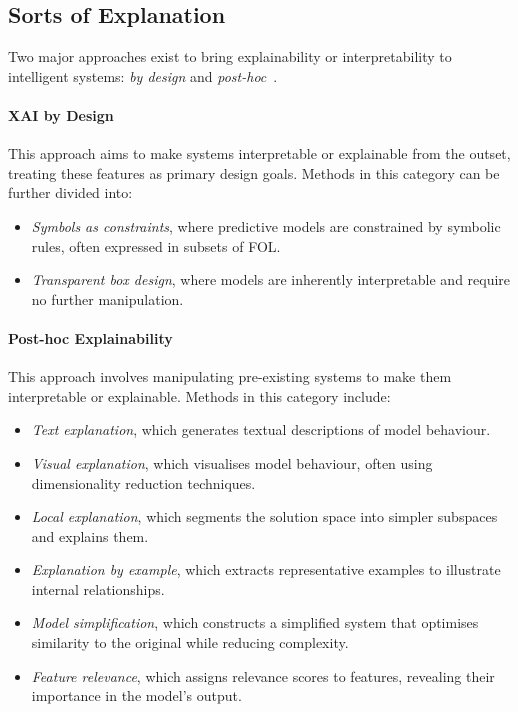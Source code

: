 \subsection{Sorts of Explanation}\label{subsec:sorts-of-explanation}
%
Two major approaches exist to bring explainability or interpretability to intelligent systems: \emph{by design} and \emph{post-hoc}~\cite{DBLP:conf/atal/CiattoSOC20,DBLP:journals/inffus/ArrietaRSBTBGGM20,DBLP:journals/csur/GuidottiMRTGP19}.


\paragraph{\Gls{XAI} by Design}
\label{par:xai-by-design}
%
This approach aims to make systems interpretable or explainable from the outset, treating these features as primary design goals.
%
Methods in this category can be further divided into:
%
\begin{itemize}
    \item \emph{Symbols as constraints}, where predictive models are constrained by symbolic rules, often expressed in subsets of \gls{FOL}.
    \item \emph{Transparent box design}, where models are inherently interpretable and require no further manipulation.
\end{itemize}

\paragraph{Post-hoc Explainability}
%
This approach involves manipulating pre-existing systems to make them interpretable or explainable.
%
Methods in this category include:
%
\begin{itemize}
    \item \emph{Text explanation}, which generates textual descriptions of model behaviour.
    \item \emph{Visual explanation}, which visualises model behaviour, often using dimensionality reduction techniques.
    \item \emph{Local explanation}, which segments the solution space into simpler subspaces and explains them.
    \item \emph{Explanation by example}, which extracts representative examples to illustrate internal relationships.
    \item \emph{Model simplification}, which constructs a simplified system that optimises similarity to the original while reducing complexity.
    \item \emph{Feature relevance}, which assigns relevance scores to features, revealing their importance in the model's output.
\end{itemize}


